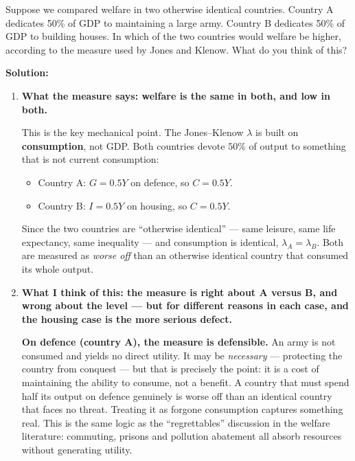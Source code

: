 \documentclass[12pt, letterpaper]{article}
\begin{document}
\begin{tcolorbox}[evenbox,title={Problem 2.4 \quad Construction and the Armed Forces}]
\begin{tcolorbox}[questionbox]
Suppose we compared welfare in two otherwise identical countries. Country A dedicates 50\% of
GDP to maintaining a large army. Country B dedicates 50\% of GDP to building houses. In which
of the two countries would welfare be higher, according to the measure used by Jones and
Klenow. What do you think of this?
\end{tcolorbox}

\textbf{Solution:}

\begin{enumerate}

\item \textbf{What the measure says: welfare is the same in both, and low in both.}

This is the key mechanical point. The Jones--Klenow $\lambda$ is built on
\textbf{consumption}, not GDP. Both countries devote $50\%$ of output to something that is
not current consumption:
\begin{itemize}[leftmargin=1.3em,itemsep=2pt,topsep=2pt]
\item Country A: $G = 0.5Y$ on defence, so $C = 0.5Y$.
\item Country B: $I = 0.5Y$ on housing, so $C = 0.5Y$.
\end{itemize}
Since the two countries are ``otherwise identical'' --- same leisure, same life expectancy,
same inequality --- and consumption is identical, $\lambda_A = \lambda_B$. Both are measured
as \emph{worse off} than an otherwise identical country that consumed its whole output.

\item \textbf{What I think of this: the measure is right about A versus B, and wrong about
the level --- but for different reasons in each case, and the housing case is the more
serious defect.}

\textbf{On defence (country A), the measure is defensible.} An army is not consumed and
yields no direct utility. It may be \emph{necessary} --- protecting the country from
conquest --- but that is precisely the point: it is a cost of maintaining the ability to
consume, not a benefit. A country that must spend half its output on defence genuinely is
worse off than an identical country that faces no threat. Treating it as forgone consumption
captures something real. This is the same logic as the ``regrettables'' discussion in the
welfare literature: commuting, prisons and pollution abatement all absorb resources without
generating utility.


\end{enumerate}
\end{tcolorbox}
\end{document}
